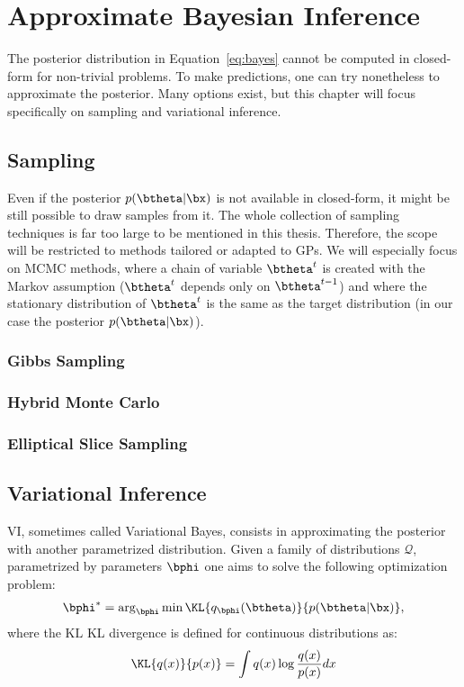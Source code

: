 \section{Approximate Bayesian Inference}
\label{sec:approx_inf}
The posterior distribution in Equation~\eqref{eq:bayes} cannot be computed in closed-form for non-trivial problems.
To make predictions, one can try nonetheless to approximate the posterior.
Many options exist, but this chapter will focus specifically on sampling and variational inference.

\subsection{Sampling}

Even if the posterior $p(\btheta|\bx)$ is not available in closed-form, it might be still possible to draw samples from it.
The whole collection of sampling techniques is far too large to be mentioned in this thesis.
Therefore, the scope will be restricted to methods tailored or adapted to \ac{GPs}.
We will especially focus on \ac{MCMC} methods, where a chain of variable $\btheta^t$ is created with the Markov assumption ($\btheta^t$ depends only on $\btheta^{t-1}$) and where the stationary distribution of $\btheta^t$ is the same as the target distribution (in our case the posterior $p(\btheta|\bx)$).

\subsubsection{Gibbs Sampling}


\subsubsection{Hybrid Monte Carlo}


\subsubsection{Elliptical Slice Sampling}


\subsection{Variational Inference}

\acf{VI}, sometimes called Variational Bayes, consists in approximating the posterior with another parametrized distribution.
Given a family of distributions $\mathcal{Q}$, parametrized by parameters $\bphi$ one aims to solve the following optimization problem:
\begin{align}
\bphi^* = \arg_{\bphi}\min \KL{q_{\bphi}(\btheta)}{p(\btheta|\bx)},
\label{eq:prob_VI}
\end{align}
where the $\mathrm{KL}$ \ac{KL} divergence is defined for continuous distributions as:
\begin{align}
\KL{q(x)}{p(x)} = \int q(x) \log \frac{q(x)}{p(x)}dx
\end{align}

